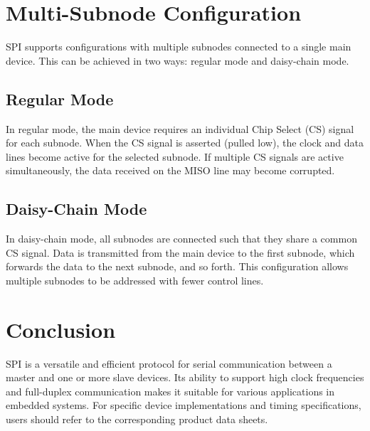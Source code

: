 \documentclass{article}
\begin{document}
\section{Multi-Subnode Configuration}
SPI supports configurations with multiple subnodes connected to a single main device. This can be achieved in two ways: regular mode and daisy-chain mode.

\subsection{Regular Mode}
In regular mode, the main device requires an individual Chip Select (CS) signal for each subnode. When the CS signal is asserted (pulled low), the clock and data lines become active for the selected subnode. If multiple CS signals are active simultaneously, the data received on the MISO line may become corrupted.

\subsection{Daisy-Chain Mode}
In daisy-chain mode, all subnodes are connected such that they share a common CS signal. Data is transmitted from the main device to the first subnode, which forwards the data to the next subnode, and so forth. This configuration allows multiple subnodes to be addressed with fewer control lines.

\section{Conclusion}
SPI is a versatile and efficient protocol for serial communication between a master and one or more slave devices. Its ability to support high clock frequencies and full-duplex communication makes it suitable for various applications in embedded systems. For specific device implementations and timing specifications, users should refer to the corresponding product data sheets.
\end{document}
